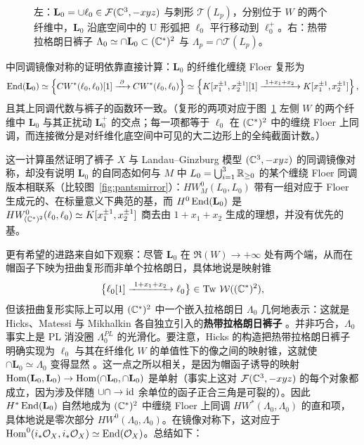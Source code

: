 \begin{figure}[t]
\caption{左：$\mathbf{L}_0=\cup\ell_0\in\mathcal{F}(\mathbb{C}^3,-xyz)$ 与刺形 $\mathcal{T}(L_p)$，分别位于 $W$ 的两个纤维中，$\mathbf{L}_0$ 沿底空间中的 U 形弧把 $\ell_0$ 平行移动到 $\ell_0^+$。右：热带拉格朗日裤子 $\Lambda_0\simeq\cap\mathbf{L}_0\subset(\mathbb{C}^*)^2$ 与 $\Lambda_p=\cap\mathcal{T}(L_p)$。}\label{fig:pantsLGmirror}
\end{figure}

\cite{AA} 中同调镜像对称的证明依靠直接计算：$\mathbf{L}_0$ 的纤维化缠绕 Floer 复形为
\[
\End(\mathbf{L}_0)\simeq
\left\{CW^*(\ell_0,\ell_0)[1]\xrightarrow{\ \partial\ }CW^*(\ell_0,\ell_0)\right\}\simeq
\left\{K[x_1^{\pm 1},x_2^{\pm 1}][1]\xrightarrow{\ 1+x_1+x_2\ }K[x_1^{\pm 1},x_2^{\pm 1}]\right\},
\]
且其上同调代数与裤子的函数环一致。（复形的两项对应于图~\ref{fig:pantsLGmirror} 左侧 $W$ 的两个纤维中 $\mathbf{L}_0$ 与其正扰动 $\mathbf{L}_0^+$ 的交点；每一项都等于 $\ell_0$ 在 $(\mathbb{C}^*)^2$ 中的缠绕 Floer 上同调，而连接微分是对纤维化底空间中可见的大二边形上的全纯截面计数。）

这一计算虽然证明了裤子 $X$ 与 Landau--Ginzburg 模型 $(\mathbb{C}^3,-xyz)$ 的同调镜像对称，却没有说明 $\mathbf{L}_0$ 的自同态如何与 $M$ 中 $L_0=\bigcup_{i=1}^3\mathbb{R}_{\ge 0}$ 的某个缠绕 Floer 同调版本相联系（比较图~\ref{fig:pantsmirror}）：$HW^0_M(L_0,L_0)$ 带有一组对应于 Floer 生成元的、在标量意义下典范的基，而 $H^0\operatorname{End}(\mathbf{L}_0)$ 是 $HW^0_{(\mathbb{C}^*)^2}(\ell_0,\ell_0)\simeq K[x_1^{\pm 1},x_2^{\pm 1}]$ 商去由 $1+x_1+x_2$ 生成的理想，并没有优先的基。

更有希望的进路来自如下观察：尽管 $\mathbf{L}_0$ 在 $\Re(W)\to+\infty$ 处有两个端，从而在帽函子下映为扭曲复形而非单个拉格朗日，具体地说是映射锥
\[
\bigl\{\ell_0[1]\xrightarrow{\ 1+x_1+x_2\ }\ell_0\bigr\}\in\Tw\,\W((\C^*)^2),
\]
但该扭曲复形实际上可以用 $(\mathbb{C}^*)^2$ 中一个嵌入拉格朗日 $\Lambda_0$ 几何地表示：这就是 Hicks、Matessi 与 Mikhalkin 各自独立引入的\textbf{热带拉格朗日裤子} \cite{Hicks,Matessi,Mikhalkin}。并非巧合，$\Lambda_0$ 事实上是 PL 消没圈 $\Lambda_0^{PL}$ 的光滑化。要注意，Hicks 的构造把热带拉格朗日裤子明确实现为 $\ell_0$ 与其在纤维化 $W$ 的单值性下的像之间的映射锥，这就使 $\cap\mathbf{L}_0\simeq\Lambda_0$ 变得显然 \cite{Hicks}。这一点之所以相关，是因为帽函子诱导的映射 $\operatorname{Hom}(\mathbf{L}_0,\mathbf{L}_0)\to\operatorname{Hom}(\cap\mathbf{L}_0,\cap\mathbf{L}_0)$ 是单射（事实上这对 $\mathcal{F}(\mathbb{C}^3,-xyz)$ 的每个对象都成立，因为涉及伴随 $\cup\cap\to\operatorname{id}$ 余单位的函子正合三角是可裂的）。因此 $H^*\operatorname{End}(\mathbf{L}_0)$ 自然地成为 $(\mathbb{C}^*)^2$ 中缠绕 Floer 上同调 $HW^*(\Lambda_0,\Lambda_0)$ 的直和项，具体地说是零次部分 $HW^0(\Lambda_0,\Lambda_0)$。在镜像对称下，这对应于 $\operatorname{Hom}^0(i_*\mathcal{O}_X,i_*\mathcal{O}_X)\simeq\operatorname{End}(\mathcal{O}_X)$。总结如下：

